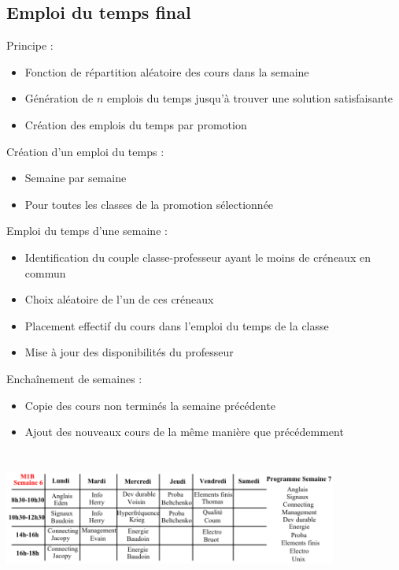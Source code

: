 \documentclass{beamer}
\begin{document}
\subsection{Emploi du temps final}

\begin{frame}
Principe :
\begin{itemize}
\item Fonction de répartition aléatoire des cours dans la semaine\\
\item Génération de $n$ emplois du temps jusqu'à trouver une solution satisfaisante\\ 
\item Création des emplois du temps par promotion
\end{itemize}
\end{frame}

\begin{frame}
Création d'un emploi du temps :\\
\begin{itemize}
\item Semaine par semaine
\item Pour toutes les classes de la promotion sélectionnée
\end{itemize}
\end{frame}

\begin{frame}
Emploi du temps d'une semaine :
\begin{itemize}
\item Identification du couple classe-professeur ayant le moins de créneaux en commun
\item Choix aléatoire de l'un de ces créneaux
\item Placement effectif du cours dans l'emploi du temps de la classe
\item Mise à jour des disponibilités du professeur
\end{itemize}
\end{frame}

\begin{frame}
Enchaînement de semaines :
\begin{itemize}
\item Copie des cours non terminés la semaine précédente
\item Ajout des nouveaux cours de la même manière que précédemment
\end{itemize}
\end{frame}

\begin{frame}
\begin{center}
\includegraphics [width=110mm, height=45mm]{Dessin3.png}
\end{center}
\end{frame}
\end{document}
